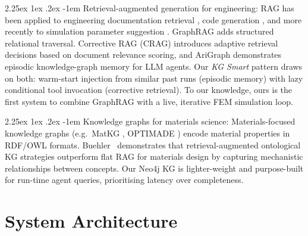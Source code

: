 \documentclass[preprint,review,12pt]{elsarticle}
\makeatletter
\renewcommand\paragraph{\@startsection{paragraph}{4}{\z@}%
  {2.25ex \@plus1ex \@minus.2ex}%
  {-1em}%
  {\normalfont\normalsize\bfseries}}
\makeatother
\begin{document}
\paragraph{Retrieval-augmented generation for engineering:}
RAG \citep{lewis2020rag} has been applied to engineering documentation
retrieval \citep{liao2023rag}, code generation \citep{gao2023rag}, and more
recently to simulation parameter suggestion \citep{yang2024rag}.  GraphRAG
\citep{edge2024graphrag} adds structured relational traversal.
Corrective RAG (CRAG) \citep{yan2024crag} introduces adaptive retrieval
decisions based on document relevance scoring, and AriGraph
\citep{arigraph2024} demonstrates episodic knowledge-graph memory for LLM
agents.  Our \emph{KG Smart} pattern draws on both: warm-start injection
from similar past runs (episodic memory) with lazy conditional tool
invocation (corrective retrieval).  To our knowledge, ours is the first
system to combine GraphRAG with a live, iterative FEM simulation loop.

\paragraph{Knowledge graphs for materials science:}
Materials-focused knowledge graphs (e.g.\ MatKG \citep{venugopal2022matkg},
OPTIMADE \citep{andersen2021optimade}) encode material properties in RDF/OWL
formats.  Buehler~\cite{buehler2024mechgpt} demonstrates that retrieval-augmented
ontological KG strategies outperform flat RAG for materials design by
capturing mechanistic relationships between concepts.
Our Neo4j KG is lighter-weight and purpose-built for run-time
agent queries, prioritising latency over completeness.

\section{System Architecture}
\label{sec:system}
\end{document}
